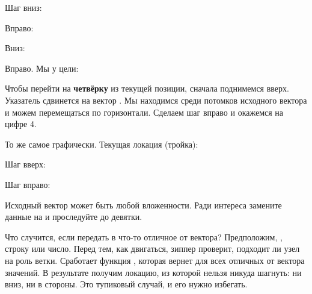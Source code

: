 Шаг вниз:

\begin{figure}[H]
  \centering
  
  \label{fig:chart-zip-05}
\end{figure}

\pagebreaklarge

Вправо:

\begin{figure}[H]
  \centering
  
  \label{fig:chart-zip-06}
\end{figure}

Вниз:

\begin{figure}[H]
  \centering
  
  \label{fig:chart-zip-07}
\end{figure}

Вправо. Мы у цели:

\begin{figure}[H]
  \centering
  
  \label{fig:chart-zip-08}
\end{figure}

Чтобы перейти на \textbf{четвёрку} из текущей позиции, сначала поднимемся
вверх. Указатель сдвинется на вектор \code{[2 3]}. Мы находимся среди потомков
исходного вектора и можем перемещаться по горизонтали. Сделаем шаг вправо и
окажемся на цифре 4.

\pagebreaklarge

То же самое графически. Текущая локация (тройка):

\begin{figure}[H]
  \centering
  
  \label{fig:chart-zip-09}
\end{figure}

Шаг вверх:

\begin{figure}[H]
  \centering
  
  \label{fig:chart-zip-10}
\end{figure}

Шаг вправо:

\begin{figure}[H]
  \centering
  
  \label{fig:chart-zip-11}
\end{figure}

Исходный вектор может быть любой вложенности. Ради интереса замените данные на
 и проследуйте до девятки.

Что случится, если передать в  что-то отличное от вектора?
Предположим, , строку или число. Перед тем, как двигаться, зиппер проверит,
подходит ли узел на роль ветки. Сработает функция , которая вернет
 для всех отличных от вектора значений. В результате получим локацию, из
которой нельзя никуда шагнуть: ни вниз, ни в стороны. Это тупиковый случай, и
его нужно избегать.

